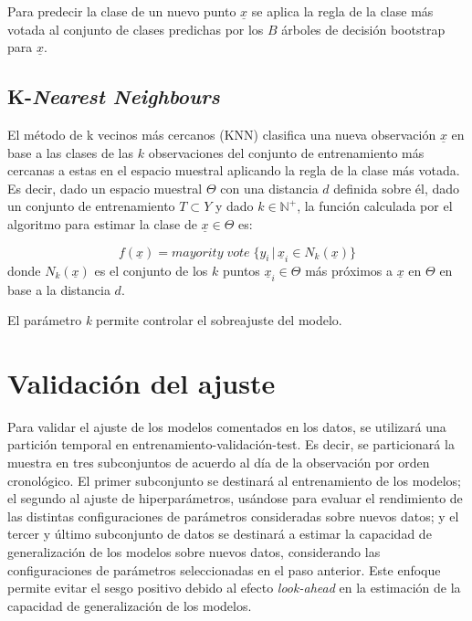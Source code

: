 \documentclass[12pt,a4paper,]{book}
\numberwithin{dummy}{section}
\theoremstyle{ocrenumbox}
\theoremstyle{blacknumex}
\theoremstyle{blacknumbox}
\theoremstyle{ocrenum}
\theoremstyle{ocrenum}
\begin{document}
Para predecir la clase de un nuevo punto \(\underline x\) se aplica la
regla de la clase más votada al conjunto de clases predichas por los
\(B\) árboles de decisión bootstrap para \(\underline x\).

\hypertarget{k-nearest-neighbours}{%
\subsection{\texorpdfstring{K-\emph{Nearest
Neighbours}}{K-Nearest Neighbours}}\label{k-nearest-neighbours}}

El método de k vecinos más cercanos (KNN) clasifica una nueva
observación \(\underline x\) en base a las clases de las \(k\)
observaciones del conjunto de entrenamiento más cercanas a estas en el
espacio muestral aplicando la regla de la clase más votada. Es decir,
dado un espacio muestral \(\Theta\) con una distancia \(d\) definida
sobre él, dado un conjunto de entrenamiento \(T \subset Y\) y dado
\(k \in \mathbb{N^+}\), la función calculada por el algoritmo para
estimar la clase de \(\underline x \in \Theta\) es:

\[f(\underline x) = mayority\; vote\;\{ y_i \,| \, \underline x_i \in N_k(\underline x)\}\]
donde \(N_k(\underline x)\) es el conjunto de los \(k\) puntos
\(\underline x_i \in \Theta\) más próximos a \(\underline x\) en
\(\Theta\) en base a la distancia \(d\).

El parámetro \emph{k} permite controlar el sobreajuste del modelo.

\hypertarget{validaciuxf3n-del-ajuste}{%
\section{Validación del ajuste}\label{validaciuxf3n-del-ajuste}}

Para validar el ajuste de los modelos comentados en los datos, se
utilizará una partición temporal en entrenamiento-validación-test. Es
decir, se particionará la muestra en tres subconjuntos de acuerdo al día
de la observación por orden cronológico. El primer subconjunto se
destinará al entrenamiento de los modelos; el segundo al ajuste de
hiperparámetros, usándose para evaluar el rendimiento de las distintas
configuraciones de parámetros consideradas sobre nuevos datos; y el
tercer y último subconjunto de datos se destinará a estimar la capacidad
de generalización de los modelos sobre nuevos datos, considerando las
configuraciones de parámetros seleccionadas en el paso anterior. Este
enfoque permite evitar el sesgo positivo debido al efecto
\emph{look-ahead} en la estimación de la capacidad de generalización de
los modelos.
\end{document}
